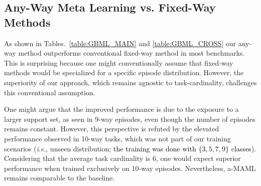 \documentclass[letterpaper]{article} %
\newcommand{\nj}[1]{\textcolor{black}{#1}}
\newcommand{\ie}{\textit{i}.\textit{e}., }
\begin{document}
\subsection{Any-Way Meta Learning vs. Fixed-Way Methods}

As shown in Tables.~\ref{table:GBML_MAIN} and \ref{table:GBML_CROSS} our any-way method outperforms conventional fixed-way method in most benchmarks. This is surprising because one might conventionally assume that fixed-way methods would be specialized for a specific episode distribution. However, the superiority of our approach, which remains agnostic to task-cardinality, challenges this conventional assumption.

One might argue that the improved performance is due to the exposure to a larger support set, as seen in 9-way episodes, even though the number of episodes remains constant. However, this perspective is refuted by the elevated performance observed in 10-way tasks, which was not part of our training scenarios (\ie unseen distribution; \nj{the training was done with $\{3,5,7,9\}$ classes}).
Considering that the average task cardinality is 6, one would expect superior performance when trained exclusively on 10-way episodes. Nevertheless, a-MAML remains comparable to the baseline. %
\end{document}
